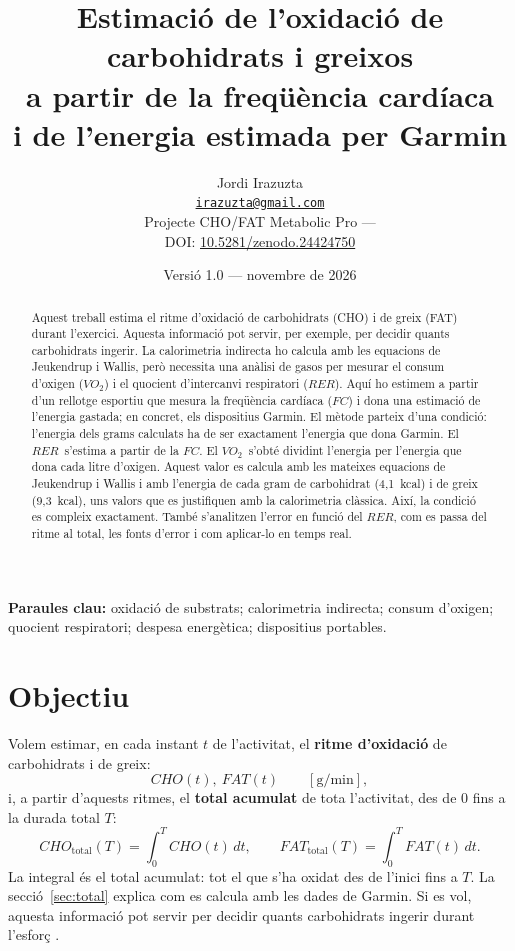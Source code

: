 \documentclass[10pt,a4paper]{article}
\title{\textbf{Estimació de l'oxidació de carbohidrats i greixos\\
a partir de la freqüència cardíaca\\ i de l'energia estimada per Garmin}}
\author{Jordi Irazuzta\\
\small\href{mailto:irazuzta@gmail.com}{\texttt{irazuzta@gmail.com}}\\[4pt]
\small Projecte CHO/FAT Metabolic Pro --- \webprojecte\\[2pt]
\small DOI: \href{https://doi.org/10.5281/zenodo.24424750}{10.5281/zenodo.24424750}}
\date{Versió 1.0 --- novembre de 2026}
\newcommand{\sub}[1]{{\scriptscriptstyle\mathrm{#1}}}   %
\newcommand{\tot}{\sub{total}}
\newcommand{\cho}{\ensuremath{\mathit{CHO}}}               %
\newcommand{\fat}{\ensuremath{\mathit{FAT}}}
\newcommand{\VO}{\ensuremath{\mathit{VO}_2}}               %
\newcommand{\RER}{\ensuremath{\mathit{RER}}}
\newcommand{\FC}{\ensuremath{\mathit{FC}}}
\begin{document}
\maketitle
{\let\thefootnote\relax{}}

\begin{abstract}
\noindent
Aquest treball estima el ritme d'oxidació de carbohidrats (CHO) i de greix (FAT) durant
l'exercici. Aquesta informació pot servir, per exemple, per decidir quants carbohidrats
ingerir. La calorimetria indirecta ho calcula amb les equacions de Jeukendrup i Wallis,
però necessita una anàlisi de gasos per mesurar el consum d'oxigen (\VO) i el quocient
d'intercanvi respiratori (\RER). Aquí ho estimem a partir d'un rellotge esportiu que mesura
la freqüència cardíaca (\FC) i dona una estimació de l'energia gastada; en concret, els
dispositius Garmin. El mètode parteix d'una condició: l'energia dels grams calculats ha de
ser exactament l'energia que dona Garmin. El \RER\ s'estima a partir de la \FC. El \VO\
s'obté dividint l'energia per l'energia que dona cada litre d'oxigen. Aquest valor es
calcula amb les mateixes equacions de Jeukendrup i Wallis i amb l'energia de cada gram de
carbohidrat (4,1~kcal) i de greix (9,3~kcal), uns valors que es justifiquen amb la
calorimetria clàssica. Així, la condició es compleix exactament. També s'analitzen
l'error en funció del \RER, com es passa del ritme al total, les fonts d'error i com aplicar-lo
en temps real.
\end{abstract}

\noindent\textbf{Paraules clau:} oxidació de substrats; calorimetria indirecta;
consum d'oxigen; quocient respiratori; despesa energètica; dispositius portables.

\section{Objectiu}\label{sec:objectiu}

Volem estimar, en cada instant $t$ de l'activitat, el \textbf{ritme d'oxidació} de
carbohidrats i de greix:
\[
  \cho(t),\ \fat(t)\qquad[\mathrm{g/min}],
\]
i, a partir d'aquests ritmes, el \textbf{total acumulat} de tota l'activitat, des de 0
fins a la durada total $T$:
\begin{equation}
  \cho_{\tot}(T)=\int_0^T\cho(t)\,dt,\qquad
  \fat_{\tot}(T)=\int_0^T\fat(t)\,dt .
  \label{eq:totals}
\end{equation}
La integral és el total acumulat: tot el que s'ha oxidat des de l'inici fins a $T$. La
secció~\ref{sec:total} explica com es calcula amb les dades de Garmin. Si es vol, aquesta informació pot servir per decidir
quants carbohidrats ingerir durant l'esforç \citep{jeukendrup2014}.
\end{document}

